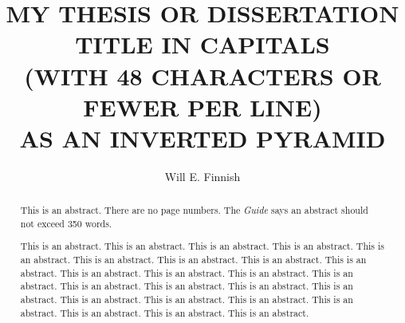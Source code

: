 \documentclass[12pt,econ]{article}
\begin{document}

%
%
\title{MY THESIS OR DISSERTATION TITLE IN CAPITALS \\
(WITH 48 CHARACTERS OR FEWER PER LINE)\\
AS AN INVERTED PYRAMID}

\author{Will E. Finnish}



\maketitle



\begin{frontmatter}


\begin{abstract}
This is an abstract.  There are no page numbers.
The \emph{Guide} says an abstract should not exceed 350 words.

This is an abstract. This is an abstract. This is an abstract. This is an abstract. This is an abstract. This is an abstract. This is an abstract. This is an abstract. This is an abstract. This is an abstract. This is an abstract. This is an abstract. This is an abstract. This is an abstract. This is an abstract. This is an abstract. This is an abstract. This is an abstract. This is an abstract. This is an abstract. This is an abstract. This is an abstract. This is an abstract. This is an abstract. 
\end{abstract}

\newpage



\tableofcontents

\newpage

\listoftables

\newpage

\listoffigures

\newpage


\end{frontmatter}
\end{document}
